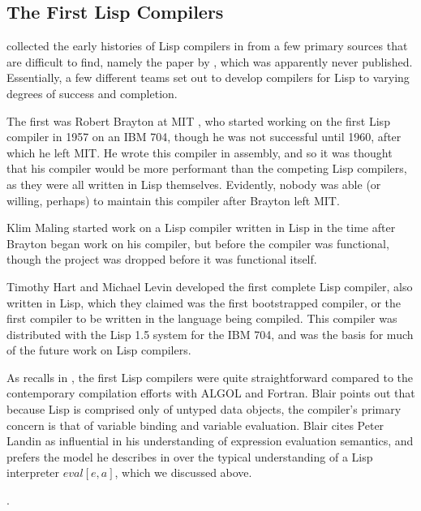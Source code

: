\subsection{The First Lisp Compilers}

\citeauthor{allen_anatomy_of_lisp_1978} collected the early histories of Lisp compilers
in \cite{allen_anatomy_of_lisp_1978}
from a few primary sources that are difficult to find, namely
the paper  by \citeauthor{blair_structure_lisp_compiler_1971},
which was apparently never published.
Essentially, a few different teams set out to develop compilers for Lisp
to varying degrees of success and completion.

The first was Robert Brayton at MIT \cite{blair_structure_lisp_compiler_1971},
who started working on the first Lisp compiler in 1957 on an IBM 704,
though he was not successful until 1960, after which he left MIT.
He wrote this compiler in assembly, and so it was thought that his compiler
would be more performant than the competing Lisp compilers, as they were
all written in Lisp themselves.
Evidently, nobody was able (or willing, perhaps) to maintain this compiler
after Brayton left MIT.

Klim Maling started work on a Lisp compiler written in Lisp
in the time after Brayton began work on his compiler, but before the compiler
was functional, though the project was dropped before it was functional itself.

Timothy Hart and Michael Levin developed the first complete Lisp compiler,
also written in Lisp, which
they claimed was the first \gls{bootstrap}ped compiler,
or the first compiler to be written in the language being compiled.
This compiler was distributed with the Lisp 1.5 system for the IBM 704,
and was the basis for much of the future work on Lisp compilers.

As \citeauthor{blair_structure_lisp_compiler_1971} recalls in ,
the first Lisp compilers were quite straightforward compared to the contemporary compilation efforts
with ALGOL and Fortran.
Blair points out that because Lisp is comprised only of untyped data objects,
the compiler's primary concern is that of variable binding and variable evaluation.
Blair cites Peter Landin as influential in his understanding of expression
evaluation semantics, and prefers the model he describes in 
over the typical understanding of a Lisp interpreter $eval[e, a]$, which we discussed above.


.
